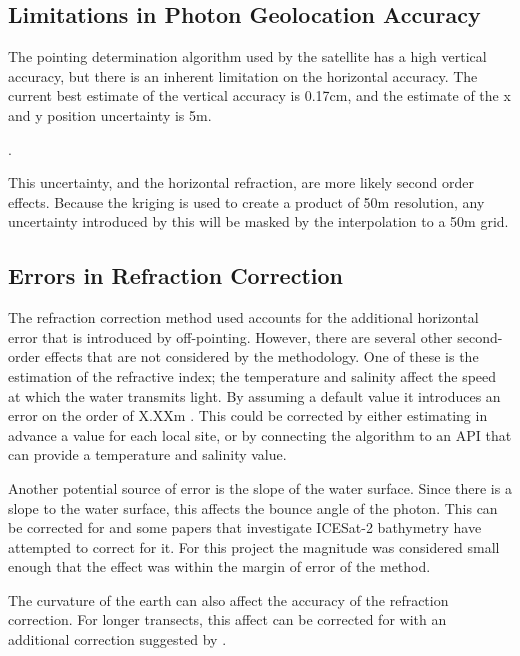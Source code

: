 \subsection{Limitations in Photon Geolocation Accuracy}

The pointing determination algorithm used by the satellite has a high vertical accuracy, but there is an inherent limitation on the horizontal accuracy. The current best estimate of the vertical accuracy is 0.17cm, and the estimate of the x and y position uncertainty is 5m.

.

This uncertainty, and the horizontal refraction, are more likely second order effects. Because the kriging is used to create a product of 50m resolution, any uncertainty introduced by this will be masked by the interpolation to a 50m grid.


\subsection{Errors in Refraction Correction}

The refraction correction method used accounts for the additional horizontal error that is introduced by off-pointing. However, there are several other second-order effects that are not considered by the methodology. One of these is the estimation of the refractive index; the temperature and salinity affect the speed at which the water transmits light. By assuming a default value it introduces an error on the order of X.XXm . This could be corrected by either estimating in advance a value for each local site, or by connecting the algorithm to an API that can provide a temperature and salinity value. 

Another potential source of error is the slope of the water surface. Since there is a slope to the water surface, this affects the bounce angle of the photon. This can be corrected for and some papers that investigate ICESat-2 bathymetry have attempted to correct for it. For this project the magnitude was considered small enough that the effect was within the margin of error of the method.

The curvature of the earth can also affect the accuracy of the refraction correction. For longer transects, this affect can be corrected for with an additional correction suggested by \citeauthor{Parrish2019}. 

